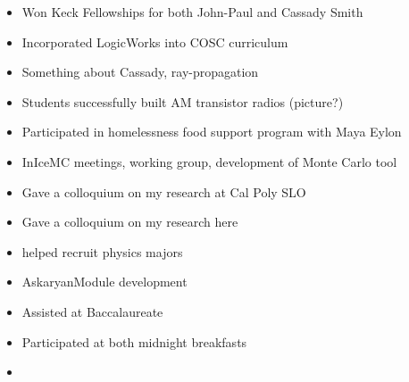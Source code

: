 \begin{itemize}
\item Won Keck Fellowships for both John-Paul and Cassady Smith
\item Incorporated LogicWorks into COSC curriculum
\item Something about Cassady, ray-propagation
\item Students successfully built AM transistor radios (picture?)
\item Participated in homelessness food support program with Maya Eylon
\item InIceMC meetings, working group, development of Monte Carlo tool
\item Gave a colloquium on my research at Cal Poly SLO
\item Gave a colloquium on my research here
\item helped recruit physics majors
\item AskaryanModule development
\item Assisted at Baccalaureate
\item Participated at both midnight breakfasts
\item 
\end{itemize}
